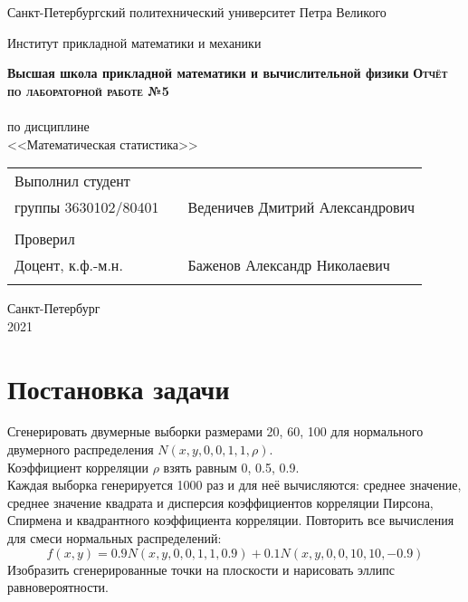 \documentclass{article}
\begin{document}
\begin{titlepage}
  \begin{center}
    \large
    Санкт-Петербургский политехнический университет Петра Великого
    
    Институт прикладной математики и механики
    
    \textbf{Высшая школа прикладной математики и вычислительной физики}
    \vfill
    \textsc{\textbf{\Large{Отчёт по лабораторной работе №5}}}\\[5mm]
    \\ по дисциплине
    \\ <<Математическая статистика>>\\
\end{center}

\vfill

\begin{tabular}{l p{} l}
Выполнил студент \\группы 3630102/80401 && Веденичев Дмитрий Александрович \\
\\
Проверил\\Доцент, к.ф.-м.н.& \hspace{0pt} &   Баженов Александр Николаевич \\\\
\end{tabular}

\hfill \break
\hfill \break
\begin{center} Санкт-Петербург \\2021 \end{center}
\thispagestyle{empty}
\end{titlepage}
\newpage
\newpage
\begin{center}
    \setcounter{page}{2}
    \tableofcontents
\end{center}
\newpage
\begin{center}
    \setcounter{page}{3}
    \listoffigures
\end{center}

\newpage

\section {Постановка задачи}
\noindent Сгенерировать двумерные выборки размерами 20, 60, 100 для нормального двумерного распределения $N(x,y,0,0,1,1,\rho)$. \\
Коэффициент корреляции $\rho$ взять равным 0, 0.5, 0.9.\\
Каждая выборка генерируется 1000 раз и для неё вычисляются: среднее значение, среднее значение квадрата и дисперсия коэффициентов корреляции Пирсона, Спирмена и квадрантного коэффициента корреляции. Повторить все вычисления для смеси нормальных распределений:
\begin{equation}
	f(x,y) = 0.9N(x,y,0,0,1,1,0.9) + 0.1N(x,y,0,0,10,10,-0.9)
\end{equation}
\noindent Изобразить сгенерированные точки на плоскости и нарисовать эллипс равновероятности.
\end{document}

